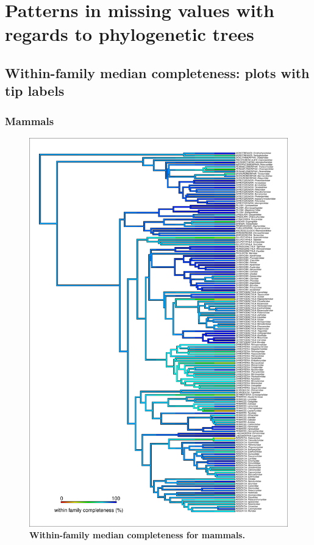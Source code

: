 \documentclass[11pt]{article}
\begin{document}
\section{Patterns in missing values with regards to phylogenetic trees}

\subsection{Within-family median completeness: plots with tip labels}

\subsubsection{Mammals}
\begin{figure}[h!]
\centering
\includegraphics[scale=0.55]{figures/NA_phylo_patterns/Mammals_completeness}
\caption[Within-family median completeness for mammals]{\textbf{Within-family median completeness for mammals.}}
\label{compPREDICTS}
\end{figure}
\end{document}
